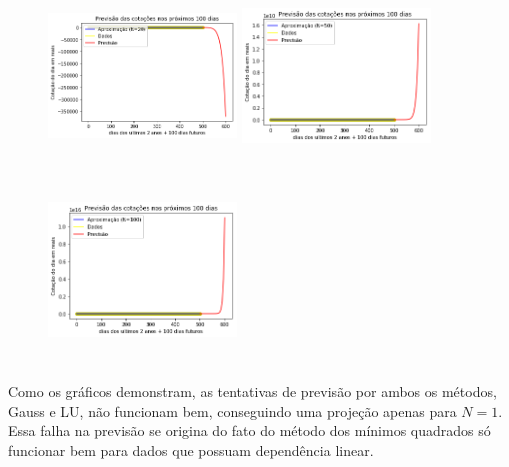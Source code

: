\documentclass{article}
\begin{document}
\begin{figure}[!htb]
\includegraphics [width=5cm,height=5cm]{Previsao (usando LU)/P20.png}
\includegraphics [width=5cm,height=5cm]{Previsao (usando LU)/P50.png}
\includegraphics [width=5cm,height=5cm]{Previsao (usando LU)/P100.png}
\end{figure}

\text Como os gráficos demonstram, as tentativas de previsão por ambos os métodos, Gauss e LU, não funcionam bem, conseguindo uma projeção apenas para $N = 1$. Essa falha na previsão se origina do fato do método dos mínimos quadrados só funcionar bem para dados que possuam dependência linear.
\end{document}
